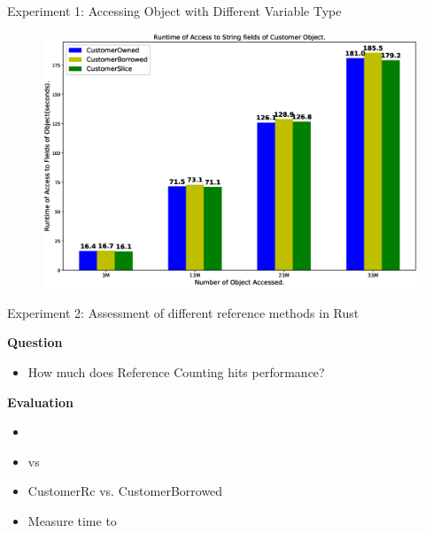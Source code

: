 \documentclass[9pt]{beamer}
\begin{document}

\begin{frame}[t, fragile]{Experiment 1: Accessing Object with Different Variable Type}

    \begin{figure}[hp]
        \centering
        \begin{center}
                \includegraphics[width=1\textwidth]{images/rust_access_different_poniter_init.eps}
                \captionsetup{labelformat=empty}
        \end{center}
    \end{figure}
\end{frame}


\begin{frame}[fragile]{Experiment 2: Assessment of different reference methods in Rust}

    \textbf{Question}
    \begin{itemize}
        \item How much does Reference Counting hits performance?
    \end{itemize}

    \vspace{0.5cm}

    \textbf{Evaluation}
    \begin{itemize}
        \item {}
        \item {} vs 
        \item CustomerRc vs. CustomerBorrowed
        \item Measure time to 
    \end{itemize}

\end{frame}
\end{document}
